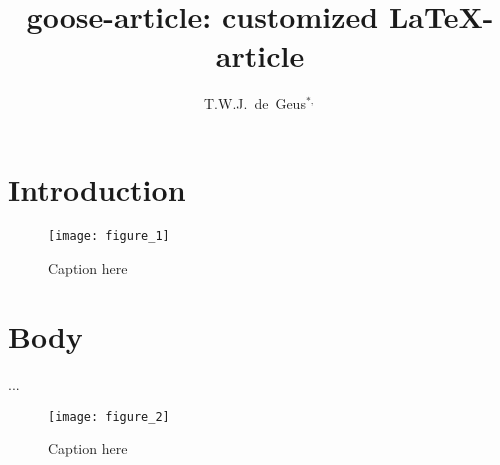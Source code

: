\documentclass{goose-article}
\title{goose-article: customized \LaTeX-article}
\author[1]{T.W.J.~de~Geus$^{*,}$}
\affil[1]{
  Physics Institute, \'{E}cole Polytechnique F\'{e}d\'{e}rale de Lausanne (EPFL) \nl
  Switzerland
}
\begin{document}
\maketitle

\begin{abstract}
\noindent
\lipsum[1]

\end{abstract}

\section{Introduction}
\lipsum[2-4] \citep{Geus10,Geus11,Geus12}

\begin{figure}[htp]
  \centering
  \texttt{[image: figure\_1]}
  \caption{Caption here}
  \label{fig:a}
\end{figure}

\section{Body}
\lipsum[5-10] \citet{Geus13,Foo.Bar} ...

\begin{figure}[htp]
  \centering
  \texttt{[image: figure\_2]}
  \caption{Caption here}
  \label{fig:b}
\end{figure}


\end{document}
